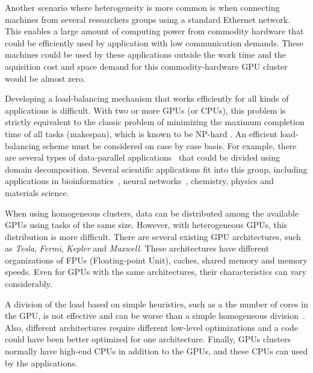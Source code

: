 \documentclass[journal]{IEEEtran}
\begin{document}
Another scenario where heterogeneity is more common is when connecting machines
from several researchers groups using a standard Ethernet network. This enables
a large amount of computing power from commodity hardware that could be
efficiently used by application with low communication demands. These machines
could be used by these applications outside the work time and the aquisition
cost and space demand for this commodity-hardware GPU cluster would be almost
zero.

Developing a load-balancing mechanism that works efficiently for all kinds of
applications is difficult. With two or more GPUs (or CPUs), this problem is
strictly equivalent to the classic problem of minimizing the maximum completion
time of all tasks (makespan), which is known to be NP-hard \cite{GaJo1979}. An
efficient load-balancing scheme must be considered on case by case basis. For
example, there are several types of data-parallel
applications~\cite{Gropp:1992uq} that could be divided using domain
decomposition. Several scientific applications fit into this group, including
applications in bioinformatics~\cite{bioinformatica2}, neural
networks~\cite{neural}, chemistry, physics and materials science.

When using homogeneous clusters, data can be distributed among the available
GPUs using tasks of the same size. However, with heterogeneous GPUs, this
distribution is more difficult. There are several existing GPU architectures,
such as \emph{Tesla},​ \emph{Fermi}, \emph{Kepler} and \emph{Maxwell}. These
architectures have different organizations of FPUs (Floating-point Unit),
caches, shared memory and memory speeds. Even for GPUs with the same
architectures, their characteristics can vary considerably.

A division of the load based on simple heuristics, such as a the number of cores
in the GPU, is not effective and can be worse than a simple homogeneous
division~\cite{raphael}. Also, different architectures require different
low-level optimizations and a code could have been better optimized for one
architecture. Finally, GPUs clusters normally have high-end CPUs in addition to
the GPUs, and these CPUs can used by the applications.

%
\end{document}
